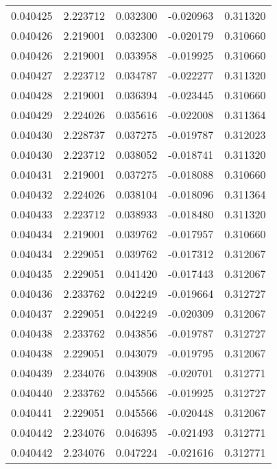 \begin{tabular}{lrrrr}
0.040425    &  2.223712 &  0.032300 & -0.020963 &             0.311320 \\
0.040426    &  2.219001 &  0.032300 & -0.020179 &             0.310660 \\
0.040426    &  2.219001 &  0.033958 & -0.019925 &             0.310660 \\
0.040427    &  2.223712 &  0.034787 & -0.022277 &             0.311320 \\
0.040428    &  2.219001 &  0.036394 & -0.023445 &             0.310660 \\
0.040429    &  2.224026 &  0.035616 & -0.022008 &             0.311364 \\
0.040430    &  2.228737 &  0.037275 & -0.019787 &             0.312023 \\
0.040430    &  2.223712 &  0.038052 & -0.018741 &             0.311320 \\
0.040431    &  2.219001 &  0.037275 & -0.018088 &             0.310660 \\
0.040432    &  2.224026 &  0.038104 & -0.018096 &             0.311364 \\
0.040433    &  2.223712 &  0.038933 & -0.018480 &             0.311320 \\
0.040434    &  2.219001 &  0.039762 & -0.017957 &             0.310660 \\
0.040434    &  2.229051 &  0.039762 & -0.017312 &             0.312067 \\
0.040435    &  2.229051 &  0.041420 & -0.017443 &             0.312067 \\
0.040436    &  2.233762 &  0.042249 & -0.019664 &             0.312727 \\
0.040437    &  2.229051 &  0.042249 & -0.020309 &             0.312067 \\
0.040438    &  2.233762 &  0.043856 & -0.019787 &             0.312727 \\
0.040438    &  2.229051 &  0.043079 & -0.019795 &             0.312067 \\
0.040439    &  2.234076 &  0.043908 & -0.020701 &             0.312771 \\
0.040440    &  2.233762 &  0.045566 & -0.019925 &             0.312727 \\
0.040441    &  2.229051 &  0.045566 & -0.020448 &             0.312067 \\
0.040442    &  2.234076 &  0.046395 & -0.021493 &             0.312771 \\
0.040442    &  2.234076 &  0.047224 & -0.021616 &             0.312771 \\

\end{tabular}
